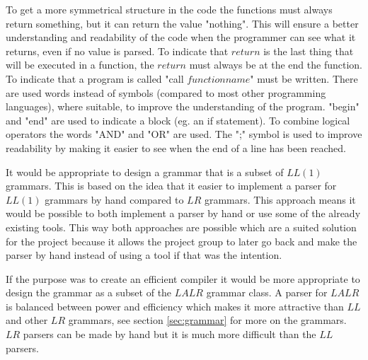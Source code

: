 To get a more symmetrical structure in the code the functions must always return something, but it can return the value "nothing". This will ensure a better understanding and readability of the code when the programmer can see what it returns, even if no value is parsed. To indicate that $return$ is the last thing that will be executed in a function, the $return$ must always be at the end the function. To indicate that a program is called "call $functionname$" must be written.
There are used words instead of symbols (compared to most other programming languages), where suitable, to improve the understanding of the program.
"begin" and "end" are used to indicate a block (eg. an if statement). To combine logical operators the words "AND" and "OR" are used. The ";" symbol is used to improve readability by making it easier to see when the end of a line has been reached.

It would be appropriate to design a grammar that is a subset of $LL(1)$ grammars. This is based on the idea that it easier to implement a parser for $LL(1)$ grammars by hand compared to $LR$ grammars. This approach means it would be possible to both implement a parser by hand or use some of the already existing tools. This way both approaches are possible which are a suited solution for the project because it allows the project group to later go back and make the parser by hand instead of using a tool if that was the intention.

If the purpose was to create an efficient compiler it would be more appropriate to design the grammar as a subset of the $LALR$ grammar class. A parser for $LALR$ is balanced between power and efficiency which makes it more attractive than $LL$ and other $LR$ grammars, see section \ref{sec:grammar} for more on the grammars. $LR$ parsers can be made by hand but it is much more difficult than the $LL$ parsers.